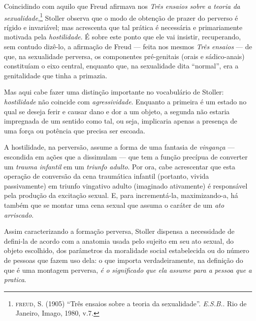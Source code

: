 Coincidindo com aquilo que Freud afirmava nos \emph{Três ensaios sobre a
teoria da sexualidade},\footnote{\textsc{freud}, S. (1905) ``Três
  ensaios sobre a teoria da sexualidade''. \emph{E.S.B.}. Rio de
  Janeiro, Imago, 1980, v.7.} Stoller observa que o modo de obtenção de
prazer do perverso é rígido e invariável; mas acrescenta que tal prática
é necessária e primariamente motivada pela \emph{hostilidade}. É sobre
este ponto que ele vai insistir, recuperando, sem contudo dizê-lo, a
afirmação de Freud --- feita nos mesmos \emph{Três ensaios} --- de que,
na sexualidade perversa, os componentes pré-genitais (orais e
sádico-anais) constituíam o eixo central, enquanto que, na sexualidade
dita ``normal'', era a genitalidade que tinha a primazia.

Mas aqui cabe fazer uma distinção importante no vocabulário de Stoller:
\emph{hostilidade} não coincide com \emph{agressividade}. Enquanto a
primeira é um estado no qual se deseja ferir e causar dano e dor a um
objeto, a segunda não estaria impregnada de um sentido como tal, ou
seja, implicaria apenas a presença de uma força ou potência que precisa
ser escoada.

A hostilidade, na perversão, assume a forma de uma fantasia de
\emph{vingança} --- escondida em ações que a dissimulam --- que tem a
função precípua de converter um \emph{trauma infantil} em um
\emph{triunfo adulto}. Por ora, cabe acrescentar que esta operação de
conversão da cena traumática infantil (portanto, vivida passivamente) em
triunfo vingativo adulto (imaginado ativamente) é responsável pela
produção da excitação sexual. E, para incrementá-la, maximizando-a, há
também que se montar uma cena sexual que assuma o caráter de um
\emph{ato arriscado}.

Assim caracterizando a formação perversa, Stoller dispensa a necessidade
de defini-la de acordo com a anatomia usada pelo sujeito em seu ato
sexual, do objeto escolhido, dos parâmetros da moralidade social
estabelecida ou do número de pessoas que fazem uso dela: o que importa
verdadeiramente, na definição do que é uma montagem perversa, \emph{é o
significado que ela assume para a pessoa que a pratica}.

